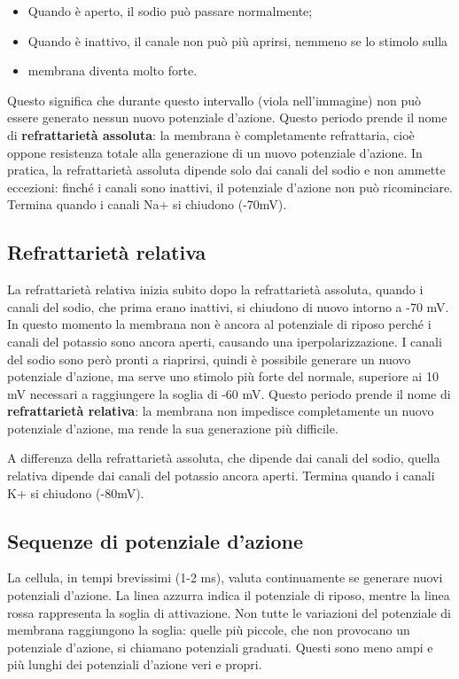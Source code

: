 \documentclass[12pt,a4paper,openany]{book}
\begin{document}
\begin{itemize}
  \item Quando è aperto, il sodio può passare normalmente;
  \item Quando è inattivo, il canale non può più aprirsi, nemmeno se lo stimolo sulla
  \item membrana diventa molto forte.
\end{itemize}
Questo significa che durante questo intervallo (viola nell'immagine) non può essere generato nessun nuovo potenziale d'azione.
Questo periodo prende il nome di \textbf{refrattarietà assoluta}: la membrana è completamente refrattaria, cioè oppone resistenza totale alla generazione di un nuovo potenziale d'azione.
In pratica, la refrattarietà assoluta dipende solo dai canali del sodio e non ammette eccezioni: finché i canali sono inattivi, il potenziale d'azione non può ricominciare. Termina quando i canali Na+ si chiudono (-70mV).


\subsection{Refrattarietà relativa}

La refrattarietà relativa inizia subito dopo la refrattarietà assoluta, quando i canali del sodio, che prima erano inattivi, si chiudono di nuovo intorno a -70 mV.
In questo momento la membrana non è ancora al potenziale di riposo perché i canali del potassio sono ancora aperti, causando una iperpolarizzazione.
I canali del sodio sono però pronti a riaprirsi, quindi è possibile generare un nuovo potenziale d'azione, ma serve uno stimolo più forte del normale, superiore ai 10 mV necessari a raggiungere la soglia di -60 mV.
Questo periodo prende il nome di \textbf{refrattarietà relativa}: la membrana non
impedisce completamente un nuovo potenziale d'azione, ma rende la sua generazione più difficile.

A differenza della refrattarietà assoluta, che dipende dai canali del sodio, quella relativa dipende dai canali del potassio ancora aperti. Termina quando i canali K+ si chiudono (-80mV).


\subsection{Sequenze di potenziale d'azione}

La cellula, in tempi brevissimi (1-2 ms), valuta continuamente se generare nuovi potenziali d'azione. La linea azzurra indica il potenziale di riposo, mentre la linea rossa rappresenta la soglia di attivazione.
Non tutte le variazioni del potenziale di membrana raggiungono la soglia: quelle più piccole, che non provocano un potenziale d'azione, si chiamano potenziali graduati. Questi sono meno ampi e più lunghi dei potenziali d'azione veri e propri.
\end{document}
